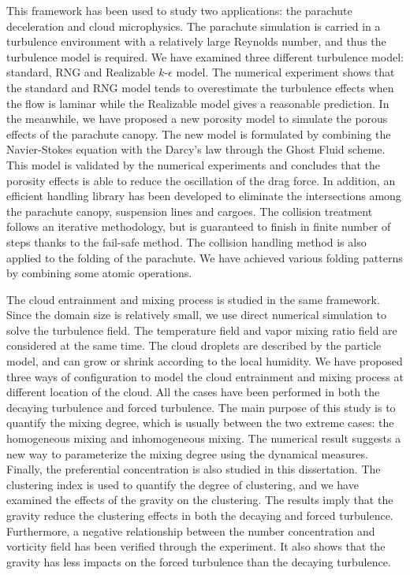 This framework has been used to study two applications: the parachute
deceleration and cloud microphysics. The parachute simulation is carried in a
turbulence environment with a relatively large Reynolds number, and thus the
turbulence model is required. We have examined three different turbulence
model: standard, RNG and Realizable $k$-$\epsilon$ model. The numerical
experiment shows that the standard and RNG model tends to overestimate the
turbulence effects when the flow is laminar while the Realizable model gives a
reasonable prediction. In the meanwhile, we have proposed a new porosity model
to simulate the porous effects of the parachute canopy. The new model is
formulated by combining the Navier-Stokes equation with the Darcy's law through
the Ghost Fluid scheme. This model is validated by the numerical experiments
and concludes that the porosity effects is able to reduce the oscillation of
the drag force. In addition, an efficient handling library has been developed
to eliminate the intersections among the parachute canopy, suspension lines and
cargoes. The collision treatment follows an iterative methodology, but is
guaranteed to finish in finite number of steps thanks to the fail-safe method.
The collision handling method is also applied to the folding of the parachute.
We have achieved various folding patterns by combining some atomic operations.

The cloud entrainment and mixing process is studied in the same framework.
Since the domain size is relatively small, we use direct numerical simulation
to solve the turbulence field. The temperature field and vapor mixing ratio
field are considered at the same time. The cloud droplets are described by the
particle model, and can grow or shrink according to the local humidity. We have
proposed three ways of configuration to model the cloud entrainment and mixing
process at different location of the cloud. All the cases have been performed
in both the decaying turbulence and forced turbulence. The main purpose of this
study is to quantify the mixing degree, which is usually between the two
extreme cases: the homogeneous mixing and inhomogeneous mixing. The numerical
result suggests a new way to parameterize the mixing degree using the dynamical
measures. Finally, the preferential concentration is also studied in this
dissertation. The clustering index is used to quantify the degree of
clustering, and we have examined the effects of the gravity on the clustering.
The results imply that the gravity reduce the clustering effects in both the
decaying and forced turbulence. Furthermore, a negative relationship between
the number concentration and vorticity field has been verified through the
experiment. It also shows that the gravity has less impacts on the forced
turbulence than the decaying turbulence.
 
